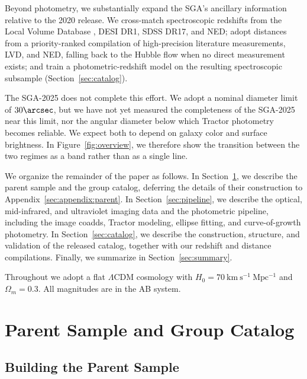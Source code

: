 \documentclass[modern,linenumbers]{aastex701}
\begin{document}
Beyond photometry, we substantially expand the SGA's ancillary
information relative to the 2020 release. We cross-match spectroscopic
redshifts from the Local Volume Database \citep[LVD;][]{pace25a}, DESI
DR1, SDSS DR17, and NED; adopt distances from a priority-ranked
compilation of high-precision literature measurements, LVD, and NED,
falling back to the Hubble flow when no direct measurement exists; and
train a photometric-redshift model on the resulting spectroscopic
subsample (Section~\ref{sec:catalog}).

The SGA-2025 does not complete this effort. We adopt a nominal diameter
limit of $30\arcsec$, but we have not yet measured the completeness of
the SGA-2025 near this limit, nor the angular diameter below which
Tractor photometry becomes reliable. We expect both to depend on galaxy
color and surface brightness. In Figure~\ref{fig:overview}, we therefore
show the transition between the two regimes as a band rather than as a
single line.

We organize the remainder of the paper as follows.
In Section~\ref{sec:parent}, we describe the parent sample and the group
catalog, deferring the details of their construction to
Appendix~\ref{sec:appendix:parent}.
In Section~\ref{sec:pipeline}, we describe the optical, mid-infrared, and
ultraviolet imaging data and the photometric pipeline, including the
image coadds, Tractor modeling, ellipse fitting, and curve-of-growth
photometry.
In Section~\ref{sec:catalog}, we describe the construction, structure, and
validation of the released catalog, together with our redshift and
distance compilations.
Finally, we summarize in Section~\ref{sec:summary}.

Throughout we adopt a flat $\Lambda$CDM cosmology with
$H_0 = 70~\mathrm{km~s^{-1}~Mpc^{-1}}$ and $\Omega_m = 0.3$.
All magnitudes are in the AB system.

\section{Parent Sample and Group Catalog}
\label{sec:parent}

\subsection{Building the Parent Sample}
\label{sec:parent:summary}
\end{document}
